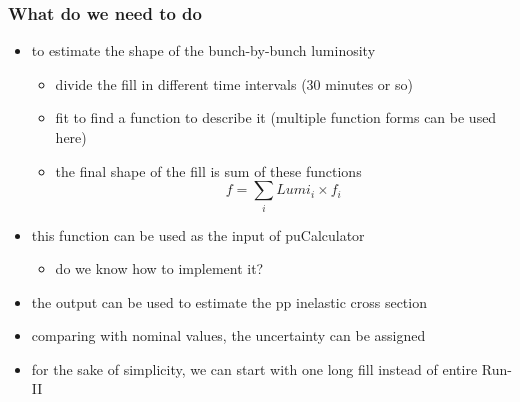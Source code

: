 \begin{frame}
  \frametitle{What do we need to do}
  \begin{itemize}
  \item to estimate the shape of the bunch-by-bunch luminosity
    \begin{itemize}
    \item divide the fill in different time intervals (30 minutes or so)
    \item fit to find a function to describe it (multiple function forms can be used here)
    \item the final shape of the fill is sum of these functions
      \begin{equation}
        f = \sum_{i}Lumi_{i}\times f_{i}
      \end{equation}
    \end{itemize}
  \item this function can be used as the input of puCalculator
    \begin{itemize}
      \item do we know how to implement it?
    \end{itemize}
  \item the output can be used to estimate the pp inelastic cross section
  \item comparing with nominal values, the uncertainty can be assigned
  \item for the sake of simplicity, we can start with one long fill instead of entire Run-II
  \end{itemize}
\end{frame}

